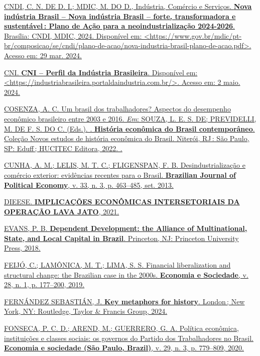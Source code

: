 {{\href{https://www.zotero.org/google-docs/?p3HTgZ}{CNDI, C. N. DE D. I.;
MDIC, M. DO D., Indústria, Comércio e Serviços. \textbf{Nova indústria
Brasil -- Nova indústria Brasil -- forte, transformadora e
sustentável\,: Plano de Ação para a neoindustrialização 2024-2026}.
Brasília: CNDI, MDIC, 2024. Disponível em:
\textless https://www.gov.br/mdic/pt-br/composicao/se/cndi/plano-de-acao/nova-industria-brasil-plano-de-acao.pdf\textgreater.
Acesso em: 29 mar. 2024.}

\href{https://www.zotero.org/google-docs/?p3HTgZ}{CNI. \textbf{CNI --
Perfil da Indústria Brasileira}. Disponível em:
\textless https://industriabrasileira.portaldaindustria.com.br/\textgreater.
Acesso em: 2 maio. 2024.}

\href{https://www.zotero.org/google-docs/?p3HTgZ}{COSENZA, A. C. Um
brasil dos trabalhadores? Aspectos do desempenho econômico brasileiro
entre 2003 e 2016. \emph{Em}: SOUZA, L. E. S. DE; PREVIDELLI, M. DE F.
S. DO C. (Eds.). . \textbf{História econômica do Brasil contemporâneo}.
Coleção Novos estudos de história econômica do Brasil. Niterói, RJ\,:
São Paulo, SP: Eduff\,; HUCITEC Editora, 2022. .}

\href{https://www.zotero.org/google-docs/?p3HTgZ}{CUNHA, A. M.; LELIS,
M. T. C.; FLIGENSPAN, F. B. Desindustrialização e comércio exterior:
evidências recentes para o Brasil. \textbf{Brazilian Journal of
Political Economy}, v. 33, n. 3, p. 463--485, set. 2013.}

\href{https://www.zotero.org/google-docs/?p3HTgZ}{DIEESE.
\textbf{IMPLICAÇÕES ECONÔMICAS INTERSETORIAIS DA OPERAÇÃO LAVA JATO},
2021.}

\href{https://www.zotero.org/google-docs/?p3HTgZ}{EVANS, P. B.
\textbf{Dependent Development: the Alliance of Multinational, State, and
Local Capital in Brazil}. Princeton, NJ: Princeton University Press,
2018.}

\href{https://www.zotero.org/google-docs/?p3HTgZ}{FEIJÓ, C.; LAMÔNICA,
M. T.; LIMA, S. S. Financial liberalization and structural change: the
Brazilian case in the 2000s. \textbf{Economia e Sociedade}, v. 28, n. 1,
p. 177--200, 2019.}

\href{https://www.zotero.org/google-docs/?p3HTgZ}{FERNÁNDEZ SEBASTIÁN,
J. \textbf{Key metaphors for history}. London\,; New York, NY:
Routledge, Taylor \& Francis Group, 2024.}

\href{https://www.zotero.org/google-docs/?p3HTgZ}{FONSECA, P. C. D.;
AREND, M.; GUERRERO, G. A. Política econômica, instituições e classes
sociais: os governos do Partido dos Trabalhadores no Brasil.
\textbf{Economia e sociedade (São Paulo, Brazil)}, v. 29, n. 3, p.
779--809, 2020.}

}}

